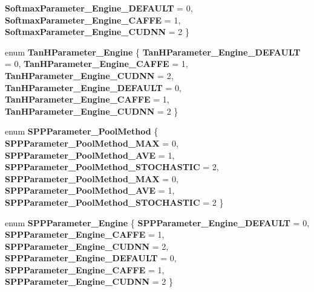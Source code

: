 \begin{DoxyCompactItemize}
{\bfseries Softmax\+Parameter\+\_\+\+Engine\+\_\+\+D\+E\+F\+A\+U\+LT} = 0, 
\newline
{\bfseries Softmax\+Parameter\+\_\+\+Engine\+\_\+\+C\+A\+F\+FE} = 1, 
{\bfseries Softmax\+Parameter\+\_\+\+Engine\+\_\+\+C\+U\+D\+NN} = 2
 \}
\item 
\mbox{\label{namespacecaffe_a08dbc063577092934d71154a2d550988}} 
enum {\bfseries Tan\+H\+Parameter\+\_\+\+Engine} \{ \newline
{\bfseries Tan\+H\+Parameter\+\_\+\+Engine\+\_\+\+D\+E\+F\+A\+U\+LT} = 0, 
{\bfseries Tan\+H\+Parameter\+\_\+\+Engine\+\_\+\+C\+A\+F\+FE} = 1, 
{\bfseries Tan\+H\+Parameter\+\_\+\+Engine\+\_\+\+C\+U\+D\+NN} = 2, 
{\bfseries Tan\+H\+Parameter\+\_\+\+Engine\+\_\+\+D\+E\+F\+A\+U\+LT} = 0, 
\newline
{\bfseries Tan\+H\+Parameter\+\_\+\+Engine\+\_\+\+C\+A\+F\+FE} = 1, 
{\bfseries Tan\+H\+Parameter\+\_\+\+Engine\+\_\+\+C\+U\+D\+NN} = 2
 \}
\item 
\mbox{\label{namespacecaffe_a781e4d743df0487fd72d5fda2ce2bf6f}} 
enum {\bfseries S\+P\+P\+Parameter\+\_\+\+Pool\+Method} \{ \newline
{\bfseries S\+P\+P\+Parameter\+\_\+\+Pool\+Method\+\_\+\+M\+AX} = 0, 
{\bfseries S\+P\+P\+Parameter\+\_\+\+Pool\+Method\+\_\+\+A\+VE} = 1, 
{\bfseries S\+P\+P\+Parameter\+\_\+\+Pool\+Method\+\_\+\+S\+T\+O\+C\+H\+A\+S\+T\+IC} = 2, 
{\bfseries S\+P\+P\+Parameter\+\_\+\+Pool\+Method\+\_\+\+M\+AX} = 0, 
\newline
{\bfseries S\+P\+P\+Parameter\+\_\+\+Pool\+Method\+\_\+\+A\+VE} = 1, 
{\bfseries S\+P\+P\+Parameter\+\_\+\+Pool\+Method\+\_\+\+S\+T\+O\+C\+H\+A\+S\+T\+IC} = 2
 \}
\item 
\mbox{\label{namespacecaffe_a95c698e6a9e3a7f5577ac7be993b4589}} 
enum {\bfseries S\+P\+P\+Parameter\+\_\+\+Engine} \{ \newline
{\bfseries S\+P\+P\+Parameter\+\_\+\+Engine\+\_\+\+D\+E\+F\+A\+U\+LT} = 0, 
{\bfseries S\+P\+P\+Parameter\+\_\+\+Engine\+\_\+\+C\+A\+F\+FE} = 1, 
{\bfseries S\+P\+P\+Parameter\+\_\+\+Engine\+\_\+\+C\+U\+D\+NN} = 2, 
{\bfseries S\+P\+P\+Parameter\+\_\+\+Engine\+\_\+\+D\+E\+F\+A\+U\+LT} = 0, 
\newline
{\bfseries S\+P\+P\+Parameter\+\_\+\+Engine\+\_\+\+C\+A\+F\+FE} = 1, 
{\bfseries S\+P\+P\+Parameter\+\_\+\+Engine\+\_\+\+C\+U\+D\+NN} = 2
 \}
\item 

\end{DoxyCompactItemize}
